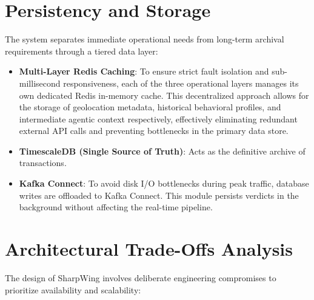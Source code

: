 \documentclass[12pt]{report}
\begin{document}
\section{Persistency and Storage}
The system separates immediate operational needs from long-term archival requirements through a tiered data layer:

\begin{itemize}
    \item \textbf{Multi-Layer Redis Caching}: To ensure strict fault isolation and sub-millisecond responsiveness, each of the three operational layers manages its own dedicated Redis in-memory cache. This decentralized approach allows for the storage of geolocation metadata, historical behavioral profiles, and intermediate agentic context respectively, effectively eliminating redundant external API calls and preventing bottlenecks in the primary data store.
    
    \item \textbf{TimescaleDB (Single Source of Truth)}: Acts as the definitive archive of transactions.
    
    \item \textbf{Kafka Connect}: To avoid disk I/O bottlenecks during peak traffic, database writes are offloaded to Kafka Connect. This module persists verdicts in the background without affecting the real-time pipeline.
    
\end{itemize}

\section{Architectural Trade-Offs Analysis}
The design of SharpWing involves deliberate engineering compromises to prioritize availability and scalability:
\end{document}
